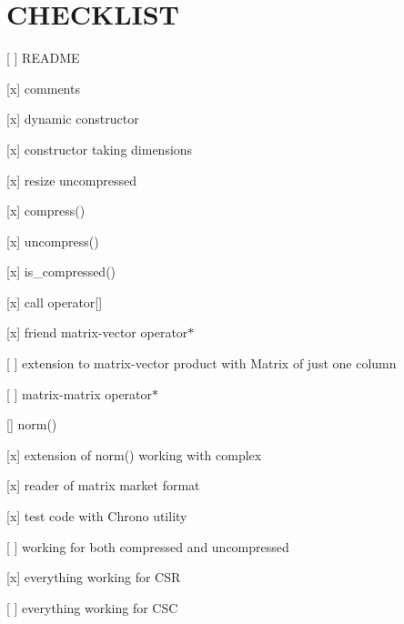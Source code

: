 \chapter{CHECKLIST}
\hypertarget{md_checklist}{}\label{md_checklist}
\label{md_checklist_autotoc_md0}%
%

\begin{DoxyItemize}
\item \mbox{[} \mbox{]} README
\item \mbox{[}x\mbox{]} comments
\item \mbox{[}x\mbox{]} dynamic constructor
\item \mbox{[}x\mbox{]} constructor taking dimensions
\item \mbox{[}x\mbox{]} resize uncompressed
\item \mbox{[}x\mbox{]} {\ttfamily compress()}
\item \mbox{[}x\mbox{]} {\ttfamily uncompress()}
\item \mbox{[}x\mbox{]} {\ttfamily is\+\_\+compressed()}
\item \mbox{[}x\mbox{]} call {\ttfamily operator\mbox{[}\mbox{]}}
\item \mbox{[}x\mbox{]} friend matrix-\/vector {\ttfamily operator\texorpdfstring{$\ast$}{*}}
\item \mbox{[} \mbox{]} extension to matrix-\/vector product with {\ttfamily Matrix} of just one column
\item \mbox{[} \mbox{]} matrix-\/matrix {\ttfamily operator\texorpdfstring{$\ast$}{*}}
\item \mbox{[}\mbox{]} {\ttfamily norm()}
\item \mbox{[}x\mbox{]} extension of {\ttfamily norm()} working with complex
\item \mbox{[}x\mbox{]} reader of matrix market format
\item \mbox{[}x\mbox{]} test code with {\ttfamily Chrono} utility
\item \mbox{[} \mbox{]} working for both compressed and uncompressed
\item \mbox{[}x\mbox{]} everything working for CSR
\item \mbox{[} \mbox{]} everything working for CSC 
\end{DoxyItemize}